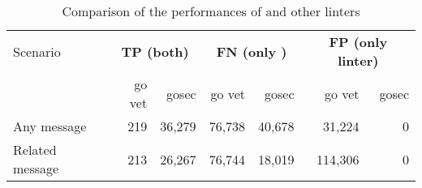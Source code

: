 \begin{table}[htp!]
    \centering
    \caption{Comparison of the performances of \toolGeiger{} and other linters}
    \label{tbl:go-geiger-evaluation-linters}
    \begin{tabular}{l|rr|rr|rr}
        Scenario        & \multicolumn{2}{c|}{\textbf{TP (both)}} & \multicolumn{2}{c|}{\textbf{FN (only \toolGeiger{})}} & \multicolumn{2}{c}{\textbf{FP (only linter)}} \\
        {}              & go vet    & gosec              & go vet          & gosec                      & go vet      & gosec                  \\
        \hline
        Any message     & 219       & 36,279             & 76,738          & 40,678                     &  31,224     & 0                      \\
        Related message & 213       & 26,267             & 76,744          & 18,019                     & 114,306     & 0                      \\
    \end{tabular}
\end{table}